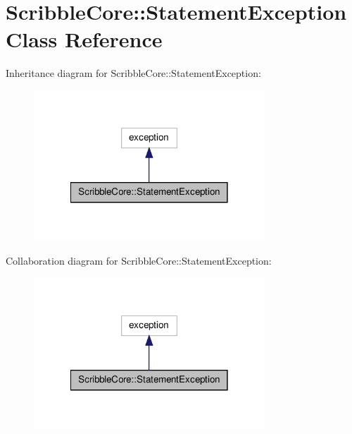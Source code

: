 \hypertarget{class_scribble_core_1_1_statement_exception}{\section{Scribble\-Core\-:\-:Statement\-Exception Class Reference}
\label{class_scribble_core_1_1_statement_exception}
}


Inheritance diagram for Scribble\-Core\-:\-:Statement\-Exception\-:
\nopagebreak
\begin{figure}[H]
\begin{center}
\leavevmode
\includegraphics[width=246pt]{class_scribble_core_1_1_statement_exception__inherit__graph}
\end{center}
\end{figure}


Collaboration diagram for Scribble\-Core\-:\-:Statement\-Exception\-:
\nopagebreak
\begin{figure}[H]
\begin{center}
\leavevmode
\includegraphics[width=246pt]{class_scribble_core_1_1_statement_exception__coll__graph}
\end{center}
\end{figure}
